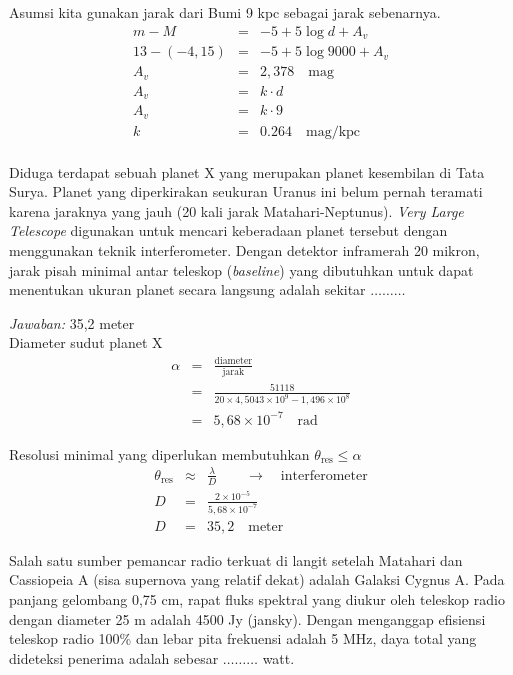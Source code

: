 \documentclass[11pt,fleqn, a4paper]{exam}
\begin{document}
\begin{questions}
Asumsi kita gunakan jarak dari Bumi 9 kpc sebagai jarak sebenarnya.
\begin{eqnarray*}
m - M &=& -5 + 5\log{d} + A_v\\
13 - (-4,15) &=& -5 + 5\log{9000} + A_v\\
A_v &=& 2,378 \quad \text{mag}\\
A_v &=& k \cdot d\\
A_v &=& k \cdot 9\\
k &=& 0.264 \quad \text{mag/kpc}\\
\end{eqnarray*}

\vspace{0.5cm}
\question Diduga terdapat sebuah planet X yang merupakan planet kesembilan di Tata Surya. Planet yang diperkirakan seukuran Uranus ini belum pernah teramati karena jaraknya yang jauh (20 kali jarak Matahari-Neptunus). \textit{Very Large Telescope} digunakan untuk mencari keberadaan planet tersebut dengan menggunakan teknik interferometer. Dengan detektor inframerah 20 mikron, jarak pisah minimal antar teleskop (\textit{baseline}) yang dibutuhkan untuk dapat menentukan ukuran planet secara langsung adalah sekitar $\ldots\ldots\ldots$

\textit{Jawaban: } 35,2 meter\\
Diameter sudut planet X 
\begin{eqnarray*}
\alpha &=& \frac{\text{diameter}}{\text{jarak}}\\
&=& \frac{51118}{20 \times 4,5043 \times 10^9 - 1,496 \times 10^8}\\
&=& 5,68 \times 10^{-7} \quad \text{rad}
\end{eqnarray*}

Resolusi minimal yang diperlukan membutuhkan $\theta_{\text{res}} \leq \alpha$
\begin{eqnarray*}
\theta_{\text{res}} &\approx& \frac{\lambda}{D} \qquad \longrightarrow \quad  \text{interferometer}\\
D &=& \frac{2 \times 10^{-5}}{5,68 \times 10^{-7}}\\
D &=& 35,2 \quad \text{meter}
\end{eqnarray*}


\vspace{0.5cm}
\question Salah satu sumber pemancar radio terkuat di langit setelah Matahari dan Cassiopeia A (sisa supernova yang relatif dekat) adalah Galaksi Cygnus A. Pada panjang gelombang 0,75 cm, rapat fluks spektral yang diukur oleh teleskop radio dengan diameter 25 m adalah 4500 Jy (jansky). Dengan menganggap efisiensi teleskop radio 100\% dan lebar pita frekuensi adalah 5 MHz, daya total yang dideteksi penerima adalah sebesar $\ldots\ldots\ldots$ watt.  


\end{questions}
\end{document}
